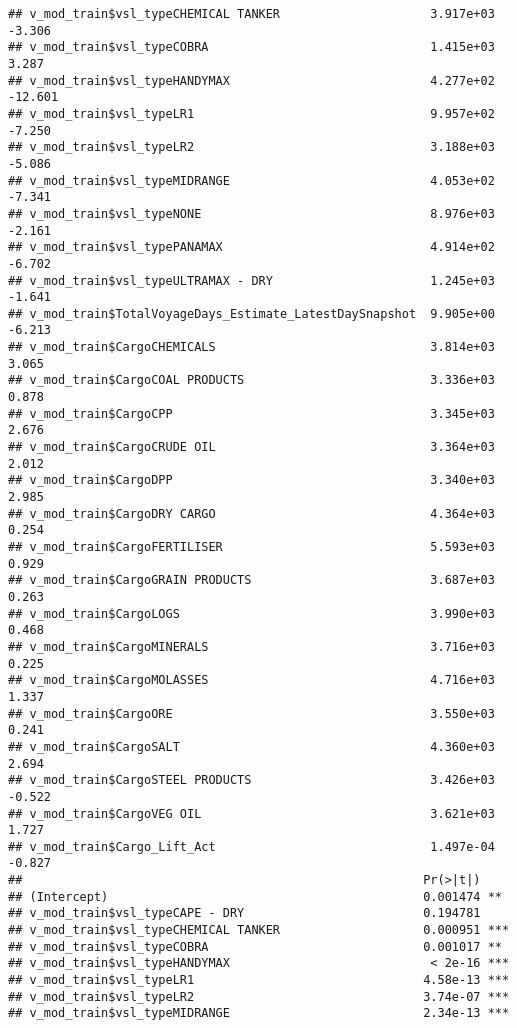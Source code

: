 \documentclass[]{article}
\begin{document}
\begin{verbatim}
## v_mod_train$vsl_typeCHEMICAL TANKER                     3.917e+03  -3.306
## v_mod_train$vsl_typeCOBRA                               1.415e+03   3.287
## v_mod_train$vsl_typeHANDYMAX                            4.277e+02 -12.601
## v_mod_train$vsl_typeLR1                                 9.957e+02  -7.250
## v_mod_train$vsl_typeLR2                                 3.188e+03  -5.086
## v_mod_train$vsl_typeMIDRANGE                            4.053e+02  -7.341
## v_mod_train$vsl_typeNONE                                8.976e+03  -2.161
## v_mod_train$vsl_typePANAMAX                             4.914e+02  -6.702
## v_mod_train$vsl_typeULTRAMAX - DRY                      1.245e+03  -1.641
## v_mod_train$TotalVoyageDays_Estimate_LatestDaySnapshot  9.905e+00  -6.213
## v_mod_train$CargoCHEMICALS                              3.814e+03   3.065
## v_mod_train$CargoCOAL PRODUCTS                          3.336e+03   0.878
## v_mod_train$CargoCPP                                    3.345e+03   2.676
## v_mod_train$CargoCRUDE OIL                              3.364e+03   2.012
## v_mod_train$CargoDPP                                    3.340e+03   2.985
## v_mod_train$CargoDRY CARGO                              4.364e+03   0.254
## v_mod_train$CargoFERTILISER                             5.593e+03   0.929
## v_mod_train$CargoGRAIN PRODUCTS                         3.687e+03   0.263
## v_mod_train$CargoLOGS                                   3.990e+03   0.468
## v_mod_train$CargoMINERALS                               3.716e+03   0.225
## v_mod_train$CargoMOLASSES                               4.716e+03   1.337
## v_mod_train$CargoORE                                    3.550e+03   0.241
## v_mod_train$CargoSALT                                   4.360e+03   2.694
## v_mod_train$CargoSTEEL PRODUCTS                         3.426e+03  -0.522
## v_mod_train$CargoVEG OIL                                3.621e+03   1.727
## v_mod_train$Cargo_Lift_Act                              1.497e-04  -0.827
##                                                        Pr(>|t|)    
## (Intercept)                                            0.001474 ** 
## v_mod_train$vsl_typeCAPE - DRY                         0.194781    
## v_mod_train$vsl_typeCHEMICAL TANKER                    0.000951 ***
## v_mod_train$vsl_typeCOBRA                              0.001017 ** 
## v_mod_train$vsl_typeHANDYMAX                            < 2e-16 ***
## v_mod_train$vsl_typeLR1                                4.58e-13 ***
## v_mod_train$vsl_typeLR2                                3.74e-07 ***
## v_mod_train$vsl_typeMIDRANGE                           2.34e-13 ***

\end{verbatim}
\end{document}
